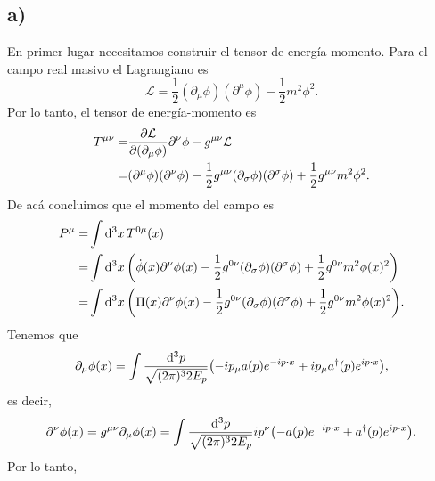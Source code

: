 \documentclass{article}
\begin{document}
\subsection*{a)}
En primer lugar necesitamos construir el tensor de energía-momento. Para el campo real masivo el Lagrangiano es
\begin{equation}
\mathcal{L}=\frac{1}{2}(\partial_\mu\phi)(\partial^\mu\phi)-\frac{1}{2}m^2\phi^2.
\end{equation} 
Por lo tanto, el tensor de energía-momento es
\begin{align}
\begin{split}
T^{\mu\nu}=&\pdv{\mathcal{L}}{(\partial_\mu\phi)}\partial^\nu\phi-g^{\mu\nu}\mathcal{L}\\
=&(\partial^\mu\phi)(\partial^\nu\phi)-\frac{1}{2}g^{\mu\nu}(\partial_\sigma\phi)(\partial^\sigma\phi)+\frac{1}{2}g^{\mu\nu}m^2\phi^2.
\end{split}
\end{align}
De acá concluimos que el momento del campo es 
\begin{align}
\begin{split}
P^\mu=&\int \dd[3]{x}T^{0\mu}(x)\\
=&\int \dd[3]{x}\qty(\dot{\phi}(x)\partial^\nu\phi(x)-\frac{1}{2}g^{0\nu}(\partial_\sigma\phi)(\partial^\sigma\phi)+\frac{1}{2}g^{0\nu}m^2\phi(x)^2)\\
=&\int \dd[3]{x}\qty(\Pi(x)\partial^\nu\phi(x)-\frac{1}{2}g^{0\nu}(\partial_\sigma\phi)(\partial^\sigma\phi)+\frac{1}{2}g^{0\nu}m^2\phi(x)^2).
\end{split}
\end{align}
Tenemos que
\begin{equation}
\partial_\mu\phi(x)=\int\frac{\dd[3]{p}}{\sqrt{(2\pi)^32E_p}}\qty(-ip_\mu a(p)e^{-ip\vdot x}+ip_\mu a^\dagger(p)e^{ip\vdot x}),
\end{equation}
es decir,
\begin{equation}
\partial^\nu\phi(x)=g^{\mu\nu}\partial_\mu\phi(x)=\int\frac{\dd[3]{p}}{\sqrt{(2\pi)^32E_p}}ip^\nu\qty(- a(p)e^{-ip\vdot x}+ a^\dagger(p)e^{ip\vdot x}).
\end{equation}
Por lo tanto,
\end{document}
